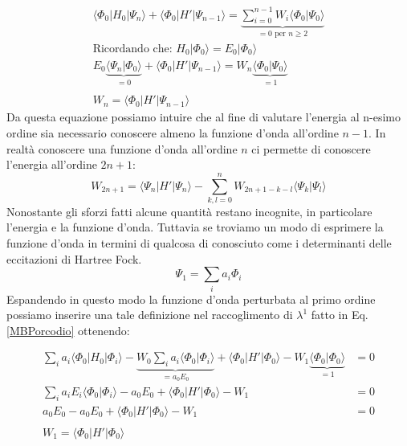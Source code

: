 \documentclass[oneside]{amsbook}
\numberwithin{section}{chapter}
\numberwithin{equation}{section}
\numberwithin{figure}{section}
\begin{document}
\begin{equation}
\begin{aligned}
\langle \Phi_0 \vert H_0 \vert \Psi_n\rangle + \langle \Phi_0 \vert H' \vert \Psi_{n-1} \rangle = \underbrace{\sum \limits _{i=0} ^{n-1} W_i \langle \Phi_0 \vert \Psi_0 \rangle}_{=0 \text{ per } n\geq 2} \\
\text{Ricordando che: } H_0\vert \Phi_0 \rangle = E_0 \vert \Phi_0 \rangle \\
E_0\underbrace{\langle \Psi_n \vert \Phi_0\rangle}_{=0} + \langle \Phi_0 \vert H' \vert \Psi_{n-1} \rangle =  W_n \underbrace{\langle \Phi_0 \vert \Psi_0 \rangle}_{=1} \\ \\
W_n= \langle \Phi_0 \vert H' \vert \Psi_{n-1}\rangle
\end{aligned}
\end{equation}
Da questa equazione possiamo intuire che al fine di valutare l'energia al n-esimo ordine sia necessario conoscere almeno la funzione d'onda all'ordine $n-1$. In realtà conoscere una funzione d'onda all'ordine $n$ ci permette di conoscere l'energia all'ordine $2n+1$:
\begin{equation}
W_{2n+1} = \langle \Psi	_n \vert H'\vert \Psi_n \rangle - \sum \limits _{k,l=0} ^n W_{2n+1-k-l} \langle \Psi_k \vert \Psi_l \rangle
\end{equation}
Nonostante gli sforzi fatti alcune quantità restano incognite, in particolare l'energia e la funzione d'onda. Tuttavia se troviamo un modo di esprimere la funzione d'onda in termini di qualcosa di conosciuto come i determinanti delle eccitazioni di Hartree Fock.
\begin{equation}
\label{kak?}
\Psi_1= \sum_i a_i \Phi_i
\end{equation}
Espandendo in questo modo la funzione d'onda perturbata al primo ordine possiamo inserire una tale definizione nel raccoglimento di $\lambda^1$ fatto in Eq.\ref{MBPorcodio} ottenendo:

\begin{equation}
\begin{aligned}
\sum_i a_i\langle \Phi_0 \vert H_0 \vert \Phi_i \rangle - \underbrace{W_0 \sum_i a_i \langle \Phi_0 \vert \Phi_i \rangle}_{= a_0E_0} +\langle \Phi_0 \vert H' \vert \Phi_0  \rangle -W_1\underbrace{ \langle \Phi_0\vert \Phi_0\rangle}_{=1} &= 0\\
\sum_i a_i E_i \langle \Phi_0\vert \Phi_i \rangle -a_0 E_0 + \langle \Phi_0 \vert H' \vert \Phi_0 \rangle - W_1 &= 0 \\
a_0 E_0 -a_0E_0 + \langle \Phi_0 \vert H' \vert \Phi_0 \rangle - W_1 &= 0 \\ \\
W_1 = \langle \Phi_0 \vert H' \vert \Phi_0 \rangle
\end{aligned}
\end{equation}
\end{document}
